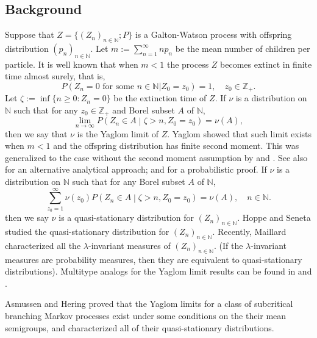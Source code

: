 \documentclass[12pt,a4paper]{amsart}
\numberwithin{equation}{section}
\theoremstyle{plain}
\theoremstyle{definition}
\theoremstyle{remark}
\begin{document}
\subsection{Background}\label{sec:BGD}
	Suppose that $Z=\{(Z_n)_{n\in \mathbb N}; P\}$
	is a Galton-Watson process with offspring distribution
		$(p_n)_{n\in \mathbb N}$.
	Let $m:=\sum^{\infty}_{n=1}np_n$ be the mean number of children per particle.
	It is well known that when $m<1$ 
	the process $Z$ becomes extinct in finite time almost surely, that is, 
\[
	P(Z_n = 0 \text{ for some $n \in \mathbb N$} | Z_0 = z_0) = 1, \quad z_0 \in \mathbb Z_+.
\]
	Let $\zeta:=\inf\{n\geq 0: Z_n=0\}$ be the extinction time of $Z$.
	If $\nu$ is a distribution on $\mathbb N$ such that for any $z_0\in \mathbb Z_+$ and 
	Borel subset $A$ of $\mathbb N$,
\[
	\lim_{n\rightarrow\infty} P\left(Z_n\in A\middle|\zeta>n , Z_0 = z_0\right)=\nu(A),
\]
then we say that $\nu$ is the Yaglom limit of $Z$.
	Yaglom \cite{Yaglom47} showed that such limit exists when $m < 1$ and the offspring distribution has finite second moment. 
	This was generalized to the case without the second moment assumption by \cite{Heathcote} and \cite{Joffe1967On}. 
	See also \cite[pages 64-65]{AthreyaNey1972Branching} for an alternative analytical approach; and \cite{LyonsPemantlePeres1995Conceptual} for a probabilistic proof.
	If $\nu$ is a distribution on $\mathbb N$ such that for any Borel subset $A$ of $\mathbb N$,
	\[
	\sum_{z_0 = 1}^\infty \nu(z_0)P\left(Z_n\in A\middle|\zeta>n , Z_0 = z_0\right)=\nu(A), \quad n \in \mathbb N.
	\]
	then we say $\nu$ is a quasi-stationary distribution for $(Z_n)_{n\in \mathbb N}$.
	Hoppe and Seneta \cite{HoppeSeneta1978Analytical} studied the quasi-stationary distribution for $(Z_n)_{n\in \mathbb N}$.
	Recently, Maillard \cite{Maillard2018The} characterized all the $\lambda$-invariant measures of $(Z_n)_{n \in \mathbb N}$. (If the $\lambda$-invariant measures are probability measures, then they are equivalent to quasi-stationary distributions). 
	Multitype analogs for the Yaglom limit results can be found in \cite{Hoppe1975Stationary, HoppeSeneta1978Analytical} and \cite{JoffeSpitzer1967On}. 
	
	Asmussen and Hering \cite[Chapter 5]{AH} proved that the Yaglom limits for a class of subcritical  branching Markov processes exist under some conditions on the their mean semigroups, and characterized all of their quasi-stationary distributions. %
\end{document}
